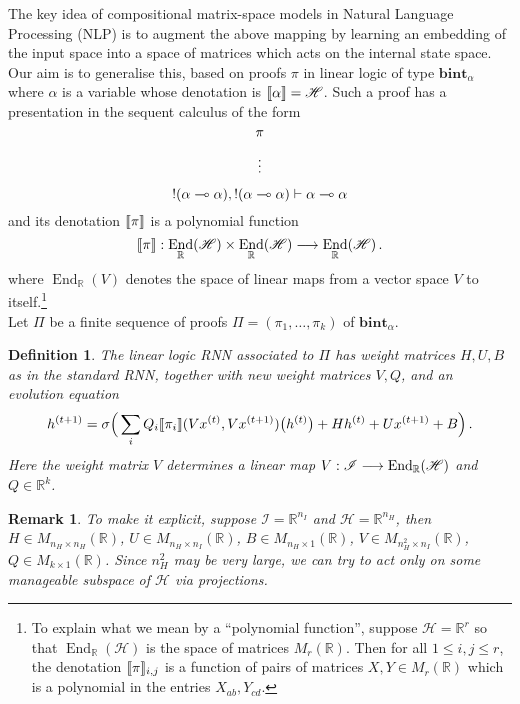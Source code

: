 \documentclass[english,letter paper,12pt,leqno]{article}
\theoremstyle{example}
\newtheorem{definition}[theorem]{Definition}
\newtheorem{remark}[theorem]{Remark}
\numberwithin{equation}{section}
\def\be{\begin{equation}}
\def\ee{\end{equation}}
\DeclareMathOperator{\End}{End}
\begin{document}
The key idea of compositional matrix-space models in Natural Language Processing (NLP) \cite{??} is to augment the above mapping by learning an embedding of the input space into a space of matrices which acts on the internal state space. Our aim is to generalise this, based on proofs $\pi$ in linear logic of type $\textbf{bint}_\alpha$ where $\alpha$ is a variable whose denotation is $\llbracket \alpha \rrbracket = \mathscr{H}$. Such a proof has a presentation in the sequent calculus of the form
\[
\AxiomC{$\pi$}
\noLine\UnaryInfC{$\vdots$}
\def\extraVskip{5pt}
\noLine\UnaryInfC{${!}(\alpha \multimap \alpha), {!}(\alpha \multimap \alpha) \vdash \alpha \multimap \alpha$}
\DisplayProof
\]
and its denotation $\llbracket \pi \rrbracket$ is a polynomial function
\[
\den{\pi}: \End_{\mathbb{R}}(\mathscr{H}) \times \End_{\mathbb{R}}(\mathscr{H}) \lto \End_{\mathbb{R}}(\mathscr{H})\,.
\]
where $\End_{\mathbb{R}}(V)$ denotes the space of linear maps from a vector space $V$ to itself.\footnote{To explain what we mean by a ``polynomial function'', suppose $\mathscr{H} = \mathbb{R}^r$ so that $\End_{\mathbb{R}}(\mathscr{H})$ is the space of matrices $M_r(\mathbb{R})$. Then for all $1 \le i,j \le r$, the denotation $\llbracket \pi \rrbracket_{i,j}$ is a function of pairs of matrices $X,Y \in M_r(\mathbb{R})$ which is a polynomial in the entries $X_{ab}, Y_{cd}$.}
\\

Let $\Pi$ be a finite sequence of proofs $\Pi = (\pi_1,\ldots,\pi_k)$ of $\textbf{bint}_\alpha$.

\begin{definition} The \emph{linear logic} RNN associated to $\Pi$ has weight matrices $H,U,B$ as in the standard RNN, together with new weight matrices $V, Q$, and an evolution equation
\be
h^{(t+1)} = \sigma\Big( \sum_i Q_i \den{\pi_i}( Vx^{(t)}, Vx^{(t+1)})\big( h^{(t)} \big) + H h^{(t)} + U x^{(t+1)} + B\Big)\,.
\ee
Here the weight matrix $V$ determines a linear map $V: \mathscr{I} \lto \End_{\mathbb{R}}(\mathscr{H})$ and $Q \in \mathbb{R}^k$.
\end{definition}

\begin{remark} To make it explicit, suppose $\mathscr{I} = \mathbb{R}^{n_I}$ and $\mathscr{H} = \mathbb{R}^{n_H}$, then $H \in M_{n_H \times n_H}(\mathbb{R})$, $U \in M_{n_H \times n_I}(\mathbb{R})$, $B \in M_{n_H \times 1}(\mathbb{R})$, $V \in M_{n_H^2 \times n_I}(\mathbb{R})$, $Q \in M_{k \times 1}(\mathbb{R})$. Since $n_H^2$ may be very large, we can try to act only on some manageable subspace of $\mathscr{H}$ via projections.
\end{remark}
\end{document}
